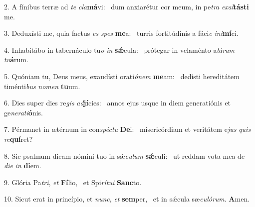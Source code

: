 2. A fínibus terræ ad \textit{te} \textit{cla}\textbf{má}vi: \ast\  dum anxiarétur cor meum, in pe\textit{tra} \textit{ex}\textit{al}\textbf{tás}\textbf{ti} me.\

3. Deduxísti me, quia factus \textit{es} \textit{spes} \textbf{me}a: \ast\  turris fortitúdinis a fáci\textit{e} \textit{in}\textit{i}\textbf{mí}ci.\

4. Inhabitábo in tabernáculo tu\textit{o} \textit{in} \textbf{sǽ}cula: \ast\  prótegar in velaménto a\textit{lá}\textit{rum} \textit{tu}\textbf{á}rum.\

5. Quóniam tu, Deus meus, exaudísti orati\textit{ó}\textit{nem} \textbf{me}am: \ast\  dedísti hereditátem timénti\textit{bus} \textit{no}\textit{men} \textbf{tu}um.\

6. Dies super dies re\textit{gis} \textit{ad}\textbf{jí}cies: \ast\  annos ejus usque in diem generatiónis et ge\textit{ne}\textit{ra}\textit{ti}\textbf{ó}nis.\

7. Pérmanet in ætérnum in con\textit{spéc}\textit{tu} \textbf{De}i: \ast\  misericórdiam et veritátem e\textit{jus} \textit{quis} \textit{re}\textbf{quí}ret?\

8. Sic psalmum dicam nómini tuo in sǽ\textit{cu}\textit{lum} \textbf{sǽ}culi: \ast\  ut reddam vota mea de \textit{di}\textit{e} \textit{in} \textbf{di}em.\

9. Glória Pa\textit{tri}, \textit{et} \textbf{Fí}lio, \ast\  et Spi\textit{rí}\textit{tu}\textit{i} \textbf{Sanc}to.\

10. Sicut erat in princípio, et \textit{nunc}, \textit{et} \textbf{sem}per, \ast\  et in sǽcula sæ\textit{cu}\textit{ló}\textit{rum}. \textbf{A}men.\

